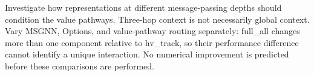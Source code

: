 \documentclass[journal]{IEEEtran}
\begin{document}
Investigate how representations at different message-passing depths should condition the value pathways. Three-hop context is not necessarily global context. Vary MSGNN, Options, and value-pathway routing separately: full\_all changes more than one component relative to hv\_track, so their performance difference cannot identify a unique interaction. No numerical improvement is predicted before these comparisons are performed.



\ifCLASSOPTIONcaptionsoff
  \newpage
\fi







%



% 







\end{document}
